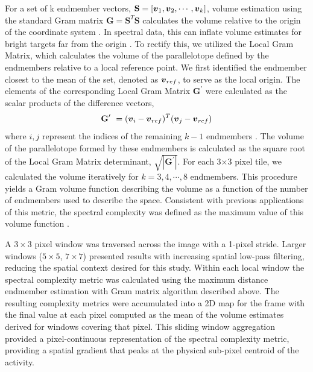 \documentclass[conference,a4paper]{IEEEtran}
\newcommand{\vecb}[1]{\mbox{\boldmath$#1$}}%
\begin{document}
For a set of k endmember vectors, $\textbf{S}=[\vecb{v}_1,\vecb{v}_2,\cdots ,\vecb{v}_k ]$, volume estimation using the standard Gram matrix $\textbf{G}=\textbf{S}^T\textbf{S}$ %
calculates the volume relative to the origin of the coordinate system \cite{ziemann_using_2010}. In spectral data, this can inflate volume estimates for bright targets far from the origin \cite{messinger_metrics_2012}. To rectify this, we utilized the Local Gram Matrix, which calculates the volume of the parallelotope defined by the endmembers relative to a local reference point. We first identified the endmember closest to the mean of the set, denoted as $\vecb{v}_{ref}$, to serve as the local origin. The elements of the corresponding Local Gram Matrix \(\textbf{G}^\prime\) were calculated as the scalar products of the difference vectors, %
\begin{equation}
    \textbf{G}^\prime\ = (\vecb{v}_i-\vecb{v}_{ref})^T(\vecb{v}_j-\vecb{v}_{ref})
\end{equation}
where $i,j$ represent the indices of the remaining $k-1$ endmembers \cite{ziemann_using_2010, messinger_metrics_2012}. The volume of the parallelotope formed by these endmembers is calculated as the square root of the Local Gram Matrix determinant, \(\sqrt{|{\textbf{G}^\prime}|}\). For each 3$\times$3 pixel tile, we calculated the volume iteratively for \(k=3,4,\cdots ,8\) endmembers. This procedure yields a Gram volume function describing the volume as a function of the number of endmembers used to describe the space. Consistent with previous applications of this metric, the spectral complexity was defined as the maximum value of this volume function \cite{messinger_metrics_2012}. 

A $3\times3$ pixel window was traversed across the image with a 1-pixel stride. Larger windows ($5\times5$, $7\times7$) presented results with increasing spatial low-pass filtering, reducing the spatial context desired for this study. %
Within each local window the spectral complexity metric was calculated using the maximum distance endmember estimation with Gram matrix algorithm described above. The resulting complexity metrics were accumulated into a 2D map for the frame with the final value at each pixel computed as the mean of the volume estimates derived for windows covering that pixel. This sliding window aggregation provided a pixel-continuous representation of the spectral complexity metric, providing a spatial gradient that peaks at the physical sub-pixel centroid of the activity. %
\end{document}
